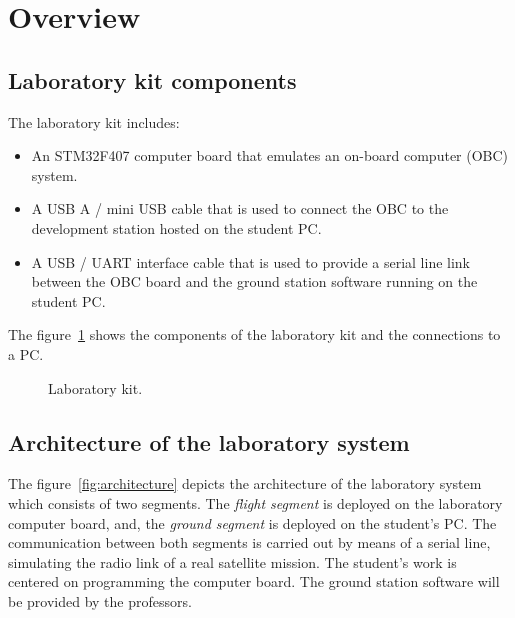 \chapter*{Overview}\label{ch:overview}

\section*{Laboratory kit components}

The laboratory kit includes:
\begin{itemize}
\item	An STM32F407 computer board that emulates an on-board computer (OBC) system.

\item	A USB A / mini USB cable that is used to connect the OBC to the development station hosted on the student PC.

\item	A USB / UART interface cable that is used to provide a serial line link between the OBC board and the ground station software running on the student PC.
\end{itemize}

The figure~\ref{fig:kit} shows the components of the laboratory kit and the connections to a PC.

\begin{figure}[h]
            \caption{Laboratory kit.}
            \label{fig:kit}
\end{figure}

\section*{Architecture of the laboratory system}

The figure~\ref{fig:architecture} depicts the architecture of the laboratory system which consists of two segments.
The \textit{flight segment} is deployed on the laboratory computer board,
and, the \textit{ground segment} is deployed on the student's PC.
The communication between both segments is carried out by means of a serial line,
simulating the radio link of a real satellite mission.
The student's work is centered on programming the computer board.
The ground station software will be provided by the professors.

